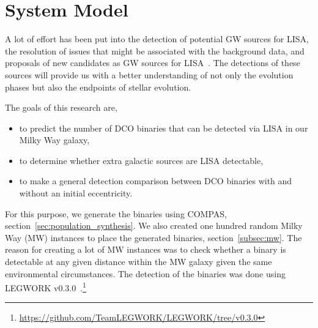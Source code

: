\documentclass[journal, twocolumn]{IEEEtran}
\begin{document}
    \section{System Model}
    \label{sec:sm}


    A lot of effort has been put into the detection of potential GW sources for LISA, the resolution of issues that
    might be associated with the background data, and proposals of new candidates as GW sources for LISA~\cite[see,
        for example,][]{Lau2020, Sesana2009, Khakhaleva2020, Renzo2021, Fumagalli2022, wagg2021gravitational,
        Broekgaarden2021, Shao2021, Andrews2020, Belczynski2010, Guo2017, Babak2010, Blaut2010, Babak2008, Ruiter2010, Nelemans2001, Yu2010}.
    The detections of these sources will provide us with a better understanding of not only the evolution phases but also the endpoints of stellar evolution.

    The goals of this research are,
    \begin{itemize}%
        \item to predict the number of DCO binaries that can be detected via LISA in our Milky Way galaxy,
        \item to determine whether extra galactic sources are LISA detectable,
        \item to make a general detection comparison between DCO binaries with and without an initial eccentricity.
    \end{itemize}%

    For this purpose, we generate the binaries using COMPAS, section~\ref{sec:population_synthesis}.
    We also created one hundred random Milky Way (MW) instances to place the generated binaries, section~\ref{subsec:mw}.
    The reason for creating a lot of MW instances was to check whether a binary is detectable at any given distance within the MW galaxy given the same environmental circumstances.
    The detection of the binaries was done using LEGWORK v0.3.0~\cite{wagg2021legwork}.\footnote{\url{https://github.com/TeamLEGWORK/LEGWORK/tree/v0.3.0}}
\end{document}
